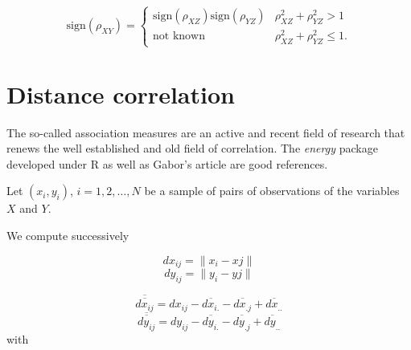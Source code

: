 \documentclass[
]{report}
\begin{document}
\begin{equation*}
\text{sign}(\rho_{XY}) 
  =
\begin{cases}
    \text{sign}(\rho_{XZ}) \text{sign}(\rho_{YZ}) & \rho_{XZ}^2 + \rho_{YZ}^2 > 1  \\
    \text{not known} & \rho_{XZ}^2 + \rho_{YZ}^2 \leq 1.
  \end{cases}
\end{equation*}


\hypertarget{distance-correlation}{%
\section{Distance correlation}\label{distance-correlation}}

The so-called association measures are an active and recent field of research that renews the well established and old field of correlation. The \emph{energy} package developed under R as well as Gabor's article \citep{discor} are good references.

Let \((x_i,y_i)\), \(i=1,2, \dots, N\) be a sample of pairs of observations of the variables \(X\) and \(Y\).

We compute successively

\[dx_{ij}=\lVert x_i-xj \rVert\]
\[dy_{ij}=\lVert y_i-yj \rVert\]

\[\overline{\overline{dx_{ij}}}=dx_{ij}-\overline{dx_{i.}}-\overline{dx_{.j}}+\overline{dx_{..}}\]
\[\overline{\overline{dy_{ij}}}=dy_{ij}-\overline{dy_{i.}}-\overline{dy_{.j}}+\overline{dy_{..}}\]
with
\end{document}
